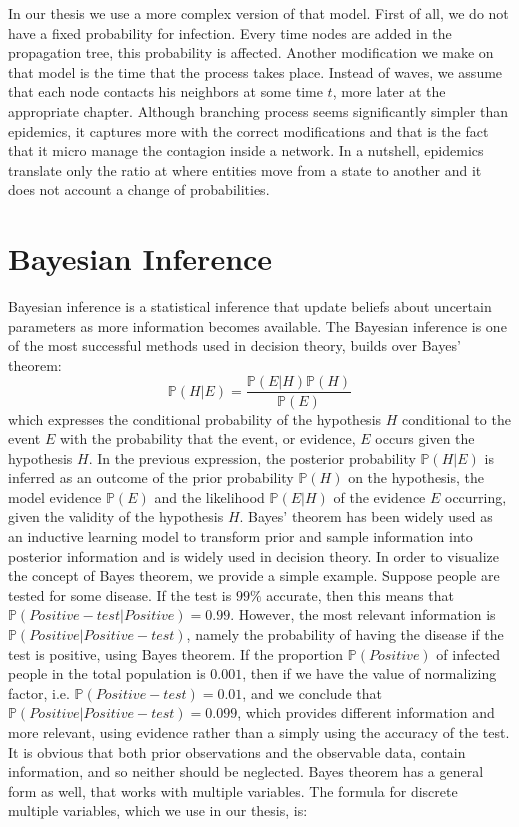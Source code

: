 In our thesis we use a more complex version of that model. First of all, we do not have a fixed probability for infection. Every time nodes are added in the propagation tree, this probability is affected. Another modification we make on that model is the time that the process takes place. Instead of waves, we assume that each node contacts his neighbors at some time $t$, more later at the appropriate chapter. Although branching process seems significantly simpler than epidemics, it captures more with the correct modifications and that is the fact that it micro manage the contagion inside a network. In a nutshell, epidemics translate only the ratio at where entities move from a state to another and it does not account a change of probabilities.

\section{Bayesian Inference}
\label{sec:BayesianInf}

Bayesian inference is a statistical inference that update beliefs about uncertain parameters as more information becomes available. The Bayesian inference is one of the most successful methods used in decision theory, builds over Bayes’ theorem:
$$\mathbb{P}(H|E) = \frac{\mathbb{P}(E|H)\mathbb{P}(H)}{\mathbb{P}(E)}$$
which expresses the conditional probability of the hypothesis $H$ conditional to the event $E$ with the probability that the event, or evidence, $E$ occurs given the hypothesis $H$. In the previous expression, the posterior probability $\mathbb{P}(H|E)$ is inferred as an outcome of the prior probability $\mathbb{P}(H)$ on the hypothesis, the model evidence $\mathbb{P}(E)$ and the likelihood $\mathbb{P}(E|H)$ of the evidence $E$ occurring, given the validity of the hypothesis $H$. Bayes’ theorem has been widely used as an inductive learning model to transform prior and sample information into posterior information and is widely used in decision theory. In order to visualize the concept of Bayes theorem, we provide a simple example. Suppose people are tested for some disease. If the test is $99\%$ accurate, then this means that  $\mathbb{P}(Positive-test|Positive)  =  0.99$. However, the  most relevant information is $\mathbb{P}(Positive|Positive-test)$, namely the probability of having the disease if the test is positive, using Bayes theorem. If the proportion $\mathbb{P}(Positive)$ of infected people in the total population is $0.001$, then if we have the value of normalizing factor, i.e. $\mathbb{P}(Positive-test)=0.01$, and we conclude that $\mathbb{P}(Positive|Positive-test) = 0.099$, which provides different information and more relevant, using evidence rather than a simply using the accuracy of the test. It is obvious that both prior observations and the observable data, contain information, and so neither should be neglected. Bayes theorem has a general form as well, that works with multiple variables. The formula for discrete multiple variables, which we use in our thesis, is:

